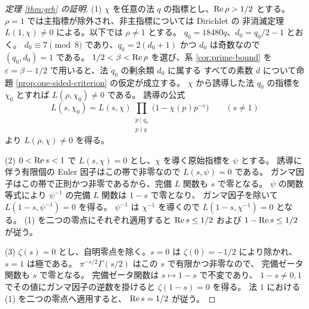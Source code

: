 \begin{proof}[定理 \ref{thm:grh} の証明]
\textup{(1)}
\(\chi\) を任意の法 \(q\) の指標とし、\(\operatorname{Re}\rho>1/2\) とする。
\(\rho=1\) では主指標が除外され、非主指標については Dirichlet の
非消滅定理 \(L(1,\chi)\ne0\) による。以下では \(\rho\ne1\) とする。
\(q_0=18480q\)、\(d_0=q_0/2-1\) とおく。
\(d_0\equiv7\pmod8\) であり、\(q_0=2(d_0+1)\) かつ \(d_0\) は奇数なので
\((q_0,d_0)=1\) である。
\(1/2<\beta<\operatorname{Re}\rho\) を選び、系 \ref{cor:prime-bound} を
\(\varepsilon=\beta-1/2\) で用いると、法 \(q_0\) の剰余類 \(d_0\) に属する
すべての素数 \(d\) について命題 \ref{prop:one-sided-criterion} の仮定が成立する。
\(\chi\) から誘導した法 \(q_0\) の指標を \(\chi_0\) とすれば
\(L(\rho,\chi_0)\ne0\) である。
誘導の公式
\[
 L(s,\chi_0)=L(s,\chi)
  \prod_{\substack{p\mid q_0\\p\nmid q}}\bigl(1-\chi(p)p^{-s}\bigr)
 \qquad(s\ne1)
\]
より \(L(\rho,\chi)\ne0\) を得る。

\textup{(2)}
\(0<\operatorname{Re} s<1\) で \(L(s,\chi)=0\) とし、\(\chi\) を導く原始指標を \(\psi\) とする。
誘導に伴う有限個の Euler 因子はこの帯で非零なので \(L(s,\psi)=0\) である。
ガンマ因子はこの帯で正則かつ非零であるから、完備 \(L\) 関数も \(s\) で零となる。
\(\psi\) の関数等式により \(\psi^{-1}\) の完備 \(L\) 関数は \(1-s\) で零となり、
ガンマ因子を除いて \(L(1-s,\psi^{-1})=0\) を得る。
\(\psi^{-1}\) は \(\chi^{-1}\) を導くので \(L(1-s,\chi^{-1})=0\) となる。
(1) を二つの零点にそれぞれ適用すると
\(\operatorname{Re} s\le1/2\) および \(1-\operatorname{Re} s\le1/2\) が従う。

\textup{(3)}
\(\zeta(s)=0\) とし、自明零点を除く。\(s=0\) は
\(\zeta(0)=-1/2\) により除かれ、\(s=1\) は極である。
\(\pi^{-s/2}\Gamma(s/2)\) はこの \(s\) で有限かつ非零なので、
完備ゼータ関数も \(s\) で零となる。
完備ゼータ関数は \(s\mapsto1-s\) で不変であり、
\(1-s\ne0,1\) でその値にガンマ因子の逆数を掛けると
\(\zeta(1-s)=0\) を得る。
法 \(1\) における (1) を二つの零点へ適用すると、
\(\operatorname{Re} s=1/2\) が従う。
\end{proof}
